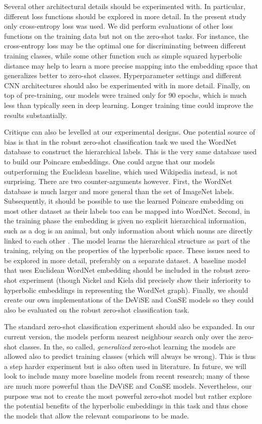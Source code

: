 \documentclass[12pt]{report}
\begin{document}
Several other architectural details should be experimented with. In particular, different loss functions should be explored in more detail. In the present study only cross-entropy loss was used. We did perform evaluations of other loss functions on the training data but not on the zero-shot tasks. For instance, the cross-entropy loss may be the optimal one for discriminating between different training classes, while some other function such as simple squared hyperbolic distance may help to learn a more precise mapping into the embedding space that generalizes better to zero-shot classes. Hyperparameter settings and different CNN architectures should also be experimented with in more detail. Finally, on top of pre-training, our models were trained only for 90 epochs, which is much less than typically seen in deep learning. Longer training time could improve the results substantially.

Critique can also be levelled at our experimental designs. One potential source of bias is that in the robust zero-shot classification task we used the WordNet database to construct the hierarchical labels. This is the very same database used to build our Poincare embeddings. One could argue that our models outperforming the Euclidean baseline, which used Wikipedia instead, is not surprising. There are two counter-arguments however. First, the WordNet database is much larger and more general than the set of ImageNet labels. Subsequently, it should be possible to use the learned Poincare embedding on most other dataset as their labels too can be mapped into WordNet. Second, in the training phase the embedding is given no explicit hierarchical information, such as a dog is an animal, but only information about which nouns are directly linked to each other \cite{Nickel2017}. The model learns the hierarchical structure as part of the training, relying on the properties of the hyperbolic space. These issues need to be explored in more detail, preferably on a separate dataset. A baseline model that uses Euclidean WordNet embedding should be included in the robust zero-shot experiment (though Nickel and Kiela \cite{Nickel2017} did precisely show their inferiority to hyperbolic embeddings in representing the WordNet graph). Finally, we should create our own implementations of the DeViSE and ConSE models so they could also be evaluated on the robust zero-shot classification task.

The standard zero-shot classification experiment should also be expanded. In our current version, the models perform nearest neighbour search only over the zero-shot classes. In the, so called, \textit{generalized} zero-shot learning the models are allowed also to predict training classes (which will always be wrong). This is thus a step harder experiment but is also often used in literature. In future, we will look to include many more baseline models from recent research; many of these are much more powerful than the DeViSE and ConSE models. Nevertheless, our purpose was not to create the most powerful zero-shot model but rather explore the potential benefits of the hyperbolic embeddings in this task and thus chose the models that allow the relevant comparisons to be made.
\end{document}
